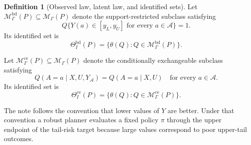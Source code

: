 \documentclass[11pt]{article}
\theoremstyle{definition}
\newtheorem{definition}{Definition}
\theoremstyle{plain}
\theoremstyle{remark}
\begin{document}
\begin{definition}[Observed law, latent law, and identified sets]
Let \(\mathcal M_\Gamma^{\mathrm{bd}}(P)\subseteq\mathcal M_\Gamma(P)\) denote
the support-restricted subclass satisfying
\[
Q\{Y(a)\in[y_L,y_U]\text{ for every }a\in\mathcal A\}=1.
\]
Its identified set is
\[
\Theta_I^{\mathrm{bd}}(P)
=
\{\theta(Q):Q\in\mathcal M_\Gamma^{\mathrm{bd}}(P)\}.
\]

Let \(\mathcal M_\Gamma^{\mathrm{ce}}(P)\subseteq\mathcal M_\Gamma(P)\) denote
the conditionally exchangeable subclass satisfying
\[
Q(A=a\mid X,U,Y_{\mathcal A})=Q(A=a\mid X,U)
\quad\text{for every }a\in\mathcal A.
\]
Its identified set is
\[
\Theta_I^{\mathrm{ce}}(P)
=
\{\theta(Q):Q\in\mathcal M_\Gamma^{\mathrm{ce}}(P)\}.
\]
\end{definition}

The note follows the convention that lower values of \(Y\) are better.  Under
that convention a robust planner evaluates a fixed policy \(\pi\) through the
upper endpoint of the tail-risk target because large values correspond to poor
upper-tail outcomes.
\end{document}

